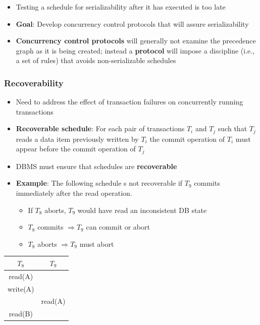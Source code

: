 \begin{itemize}[label=\(\rhd\)]
    \item Testing a schedule for serializability after it has executed is too late
    \item \textbf{Goal}: Develop concurrency control protocols that will assure serializability
    \item \textbf{Concurrency control protocols} will generally not examine the precedence graph as it is being created; instead a \textbf{protocol} will impose a discipline (i.e., a set of rules) that avoids non-serializable schedules
\end{itemize}

\subsubsection{Recoverability}
\begin{itemize}[label=\(\rhd\)]
    \item Need to address the effect of transaction failures on concurrently running transactions
    \item \textbf{Recoverable schedule}: For each pair of transactions $T_i$ and $T_j$ such that $T_j$ reads a data item previously written by $T_i$ the commit operation of $T_i$ must appear before the commit operation of $T_j$
    \item DBMS must ensure that schedules are \textbf{recoverable}
\end{itemize}

\begin{minipage}{0.75\textwidth}
\begin{itemize}[label=\(\rhd\)]
    \item \textbf{Example}: The following schedule s not recoverable if $T_9$ commits immediately after the read operation.
    \begin{itemize}[label=\(\rhd\)]
        \item If $T_8$ aborts, $T_9$ would have read an inconsistent DB state
        \item $T_8$ commits $\Rightarrow T_9$ can commit or abort
        \item $T_8$ aborts $\Rightarrow T_9$ must abort
    \end{itemize}
\end{itemize}
\end{minipage}
\begin{minipage}{0.25\textwidth}
    
    \begin{table}[H]
    \centering
        \begin{tabular}{c|c}
             $T_8$& $T_9$\\
             \hline
             read(A)& \\
             write(A)& \\
             & read(A)\\
             read(B)& \\
        \end{tabular}
    \end{table}
\end{minipage}

